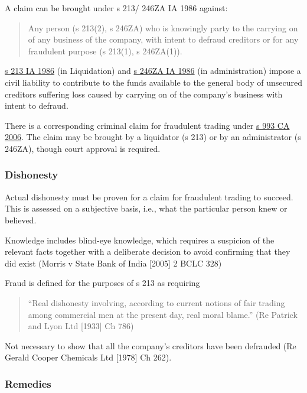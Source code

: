 \documentclass[
]{article}
\begin{document}
A claim can be brought under s 213/ 246ZA IA 1986 against:

\begin{quote}
Any person (s 213(2), s 246ZA) who is knowingly party to the carrying on
of any business of the company, with intent to defraud creditors or for
any fraudulent purpose (s 213(1), s 246ZA(1)).
\end{quote}

\href{https://www.legislation.gov.uk/ukpga/1986/45/section/213}{s 213 IA
1986} (in Liquidation) and
\href{https://www.legislation.gov.uk/ukpga/1986/45/section/246ZA}{s
246ZA IA 1986} (in administration) impose a civil liability to
contribute to the funds available to the general body of unsecured
creditors suffering loss caused by carrying on of the company's business
with intent to defraud.

There is a corresponding criminal claim for fraudulent trading under
\href{https://www.legislation.gov.uk/ukpga/2006/46/section/993}{s 993 CA
2006}. The claim may be brought by a liquidator (s 213) or by an
administrator (s 246ZA), though court approval is required.

\hypertarget{dishonesty}{%
\subsubsection{Dishonesty}\label{dishonesty}}

Actual dishonesty must be proven for a claim for fraudulent trading to
succeed. This is assessed on a subjective basis, i.e., what the
particular person knew or believed.

Knowledge includes blind-eye knowledge, which requires a suspicion of
the relevant facts together with a deliberate decision to avoid
confirming that they did exist (Morris v State Bank of India {[}2005{]}
2 BCLC 328)

Fraud is defined for the purposes of s 213 as requiring

\begin{quote}
``Real dishonesty involving, according to current notions of fair
trading among commercial men at the present day, real moral blame.'' (Re
Patrick and Lyon Ltd {[}1933{]} Ch 786)
\end{quote}

Not necessary to show that all the company's creditors have been
defrauded (Re Gerald Cooper Chemicals Ltd {[}1978{]} Ch 262).

\hypertarget{remedies-1}{%
\subsubsection{Remedies}\label{remedies-1}}
\end{document}
